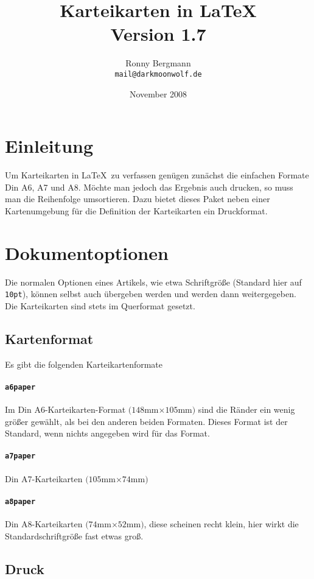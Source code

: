 \documentclass[a4paper]{article}
\begin{document}
\title{Karteikarten in \LaTeX\\{\normalsize Version 1.7}}
\author{Ronny Bergmann\\\texttt{mail@darkmoonwolf.de}}
\date{November 2008}
\maketitle
\section{Einleitung}
Um Karteikarten in \LaTeX\ zu verfassen genügen zunächst die einfachen Formate Din A6, A7 und A8. Möchte man jedoch das Ergebnis auch drucken, so muss man die Reihenfolge umsortieren. Dazu bietet dieses Paket neben einer Kartenumgebung für die Definition der Karteikarten ein Druckformat.

\section{Dokumentoptionen}
Die normalen Optionen eines Artikels, wie etwa Schriftgröße (Standard hier auf \lstinline!10pt!), können selbst auch übergeben werden und werden dann 
weitergegeben. Die Karteikarten sind stets im Querformat gesetzt.
\subsection{Kartenformat}
Es gibt die folgenden Karteikartenformate
\paragraph{\lstinline!a6paper!} Im Din A6-Karteikarten-Format $(148$mm$\times 105$mm$)$ sind die Ränder ein wenig größer gewählt, als bei den anderen beiden Formaten. Dieses Format ist der Standard, wenn nichts angegeben wird für das Format.
\paragraph{\lstinline!a7paper!} Din A7-Karteikarten $(105$mm$\times 74$mm$)$
\paragraph{\lstinline!a8paper!} Din A8-Karteikarten $(74$mm$\times 52$mm$)$, diese scheinen recht klein, hier wirkt die Standardschriftgröße fast etwas groß.
\subsection{Druck}
\end{document}
